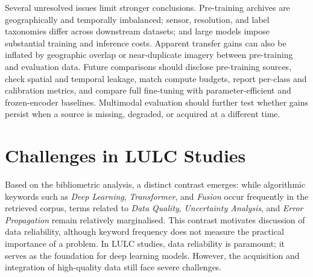 \documentclass[]{interact}
\theoremstyle{plain}%
\theoremstyle{definition}
\theoremstyle{remark}
\DeclareRobustCommand{\DIFadd}[1]{{\protect\color{DIFaddcolor}\uwave{#1}}}
\DeclareRobustCommand{\DIFdel}[1]{{\protect\color{DIFdelcolor}\sout{#1}}}
\def\DIFadd#1{#1}%
\def\DIFdel#1{}%
\begin{document}
\DIFadd{Several} \DIFadd{unresolved} \DIFadd{issues} \DIFadd{limit} \DIFadd{stronger} \DIFadd{conclusions}\DIFadd{.} \DIFadd{Pre-training} \DIFadd{archives} \DIFadd{are} \DIFadd{geographically} \DIFadd{and} \DIFadd{temporally} \DIFadd{imbalanced}\DIFadd{;} \DIFadd{sensor}\DIFadd{,} \DIFadd{resolution}\DIFadd{,} \DIFadd{and} \DIFadd{label} \DIFadd{taxonomies} \DIFadd{differ} \DIFadd{across} \DIFadd{downstream} \DIFadd{datasets}\DIFadd{;} \DIFadd{and} \DIFadd{large} \DIFadd{models} \DIFadd{impose} \DIFadd{substantial} \DIFadd{training} \DIFadd{and} \DIFadd{inference} \DIFadd{costs}\DIFadd{.} \DIFadd{Apparent} \DIFadd{transfer} \DIFadd{gains} \DIFadd{can} \DIFadd{also} \DIFadd{be} \DIFadd{inflated} \DIFadd{by} \DIFadd{geographic} \DIFadd{overlap} \DIFadd{or} \DIFadd{near-duplicate} \DIFadd{imagery} \DIFadd{between} \DIFadd{pre-training} \DIFadd{and} \DIFadd{evaluation} \DIFadd{data}\DIFadd{.} \DIFadd{Future} \DIFadd{comparisons} \DIFadd{should} \DIFadd{disclose} \DIFadd{pre-training} \DIFadd{sources}\DIFadd{,} \DIFadd{check} \DIFadd{spatial} \DIFadd{and} \DIFadd{temporal} \DIFadd{leakage}\DIFadd{,} \DIFadd{match} \DIFadd{compute} \DIFadd{budgets}\DIFadd{,} \DIFadd{report} \DIFadd{per-class} \DIFadd{and} \DIFadd{calibration} \DIFadd{metrics}\DIFadd{,} \DIFadd{and} \DIFadd{compare} \DIFadd{full} \DIFadd{fine-tuning} \DIFadd{with} \DIFadd{parameter-efficient} \DIFadd{and} \DIFadd{frozen-encoder} \DIFadd{baselines}\DIFadd{.} \DIFadd{Multimodal} \DIFadd{evaluation} \DIFadd{should} \DIFadd{further} \DIFadd{test} \DIFadd{whether} \DIFadd{gains} \DIFadd{persist} \DIFadd{when} \DIFadd{a} \DIFadd{source} \DIFadd{is} \DIFadd{missing}\DIFadd{,} \DIFadd{degraded}\DIFadd{,} \DIFadd{or} \DIFadd{acquired} \DIFadd{at} \DIFadd{a} \DIFadd{different} \DIFadd{time}\DIFadd{.}

\section{Challenges in LULC Studies}
Based on the bibliometric analysis, a distinct contrast emerges: while algorithmic keywords such as \textit{Deep Learning}, \textit{Transformer}, and \textit{Fusion} \DIFdel{exhibit} \DIFdel{extremely} \DIFdel{high} \DIFdel{heat} \DIFadd{occur} \DIFadd{frequently} \DIFadd{in} \DIFadd{the} \DIFadd{retrieved} \DIFadd{corpus}, terms related to \textit{Data Quality}, \textit{Uncertainty Analysis}, and \textit{Error Propagation} remain relatively \DIFdel{marginalized} \DIFadd{marginalised}. This \DIFdel{suggests} \DIFdel{that} \DIFdel{current} \DIFdel{research} \DIFdel{emphasis} \DIFdel{leans} \DIFdel{heavily} \DIFdel{toward} \DIFdel{architectural} \DIFdel{innovation} \DIFadd{contrast} \DIFadd{motivates} \DIFadd{discussion} \DIFadd{of} \DIFadd{data} \DIFadd{reliability}, \DIFdel{potentially} \DIFdel{overlooking} \DIFadd{although} \DIFadd{keyword} \DIFadd{frequency} \DIFadd{does} \DIFadd{not} \DIFadd{measure} the \DIFdel{reliability} \DIFadd{practical} \DIFadd{importance} of \DIFdel{the} \DIFdel{underlying} \DIFdel{data} \DIFadd{a} \DIFadd{problem}. In LULC studies, data reliability is paramount; it serves as the foundation for deep learning models. However, the acquisition and integration of high-quality data still face severe challenges.
\end{document}
